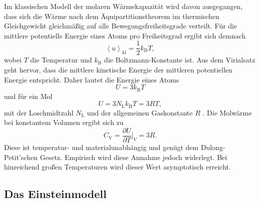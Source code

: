 Im klassischen Modell der molaren Wärmekapazität wird davon ausgegangen, dass sich die Wärme nach dem Äquipartitionstheorem im thermischen Gleichgewicht gleichmäßig auf alle Bewegungsfreiheitsgrade verteilt.
Für die mittlere potentielle Energie eines Atoms pro Freiheitsgrad ergibt sich demnach
\begin{equation}
  \left\langle u \right\rangle_{\text{kl}} = \frac{1}{2}k_{\text{B}}T,
\end{equation}
wobei $T$ die Temperatur und $k_{\text{B}}$ die Boltzmann-Konstante \cite{scipy} ist.
Aus dem Virialsatz geht hervor, dass die mittlere kinetische Energie der mittleren potentiellen Energie entspricht.
Daher lautet die Energie eines Atoms
\begin{equation}
  U = 3k_{\text{B}}T
\end{equation}
und für ein Mol
\begin{equation}
  U = 3N_{\text{L}}k_{\text{B}}T = 3RT,
\end{equation}
mit der Loschmidtzahl $N_{\text{L}}$ und der allgemeinen Gaskonstante $R$ \cite{scipy}.
Die Molwärme bei konstantem Volumen ergibt sich zu
\begin{equation}
  C_{\text{V}} = \frac{\partial U}{\partial T}\biggr|_V = 3R.
\end{equation}
Diese ist temperatur- und materialunabhängig und genügt dem Dulong-Petit'schen Gesetz.
Empirisch wird diese Annahme jedoch widerlegt.
Bei hinreichend großen Temperaturen wird dieser Wert asymptotisch erreicht.

\subsection{Das Einsteinmodell}


